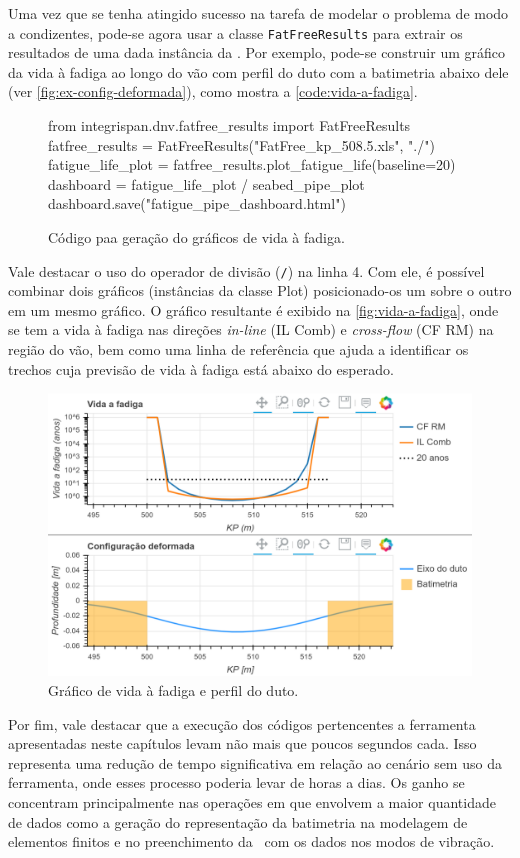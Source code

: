 Uma vez que se tenha atingido sucesso na tarefa de modelar o problema de modo a condizentes, pode-se agora usar a classe \texttt{FatFreeResults} para extrair os resultados de uma dada instância da \fatfree. Por exemplo, pode-se construir um gráfico da vida à fadiga ao longo do vão com perfil do duto com a batimetria abaixo dele (ver \autoref{fig:ex-config-deformada}), como mostra a \autoref{code:vida-a-fadiga}.

\begin{figure}[!ht]
	\caption{Código paa geração do gráficos de vida à fadiga.}\label{code:vida-a-fadiga}
	\begin{pythoncode}
from integrispan.dnv.fatfree_results import FatFreeResults
fatfree_results = FatFreeResults("FatFree_kp_508.5.xls", "./")
fatigue_life_plot = fatfree_results.plot_fatigue_life(baseline=20)
dashboard = fatigue_life_plot / seabed_pipe_plot
dashboard.save("fatigue_pipe_dashboard.html")
	\end{pythoncode}
\end{figure}

Vale destacar o uso do operador de divisão (\texttt{/}) na linha 4. Com ele, é possível combinar dois gráficos (instâncias da classe Plot) posicionado-os um sobre o outro em um mesmo gráfico. O gráfico resultante é exibido na \autoref{fig:vida-a-fadiga}, onde se tem a vida à fadiga nas direções \textit{in-line} (IL Comb) e \textit{cross-flow} (CF RM) na região do vão, bem como uma linha de referência que ajuda a identificar os trechos cuja previsão de vida à fadiga está abaixo do esperado.

\begin{figure}[!ht]
	\centering
	\caption{Gráfico de vida à fadiga e perfil do duto.}\label{fig:vida-a-fadiga}
	\includegraphics[width=\textwidth]{imagens/exemplo/vida-a-fadiga}
\end{figure}

Por fim, vale destacar que a execução dos códigos pertencentes a ferramenta apresentadas neste capítulos levam não mais que poucos segundos cada. Isso representa uma redução de tempo significativa em relação ao cenário sem uso da ferramenta, onde esses processo poderia levar de horas a dias. Os ganho se concentram principalmente nas operações em que envolvem a maior quantidade de dados como a geração do representação da batimetria na modelagem de elementos finitos e no preenchimento da \fatfree\ com os dados nos modos de vibração.